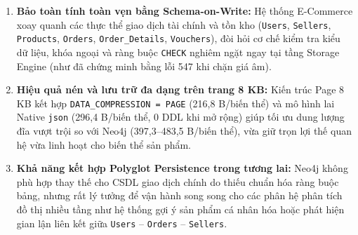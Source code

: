 \begin{enumerate}
  \item \textbf{Bảo toàn tính toàn vẹn bằng Schema-on-Write:} Hệ thống E-Commerce xoay quanh các thực thể giao dịch tài chính và tồn kho (\texttt{Users}, \texttt{Sellers}, \texttt{Products}, \texttt{Orders}, \texttt{Order\_Details}, \texttt{Vouchers}), đòi hỏi cơ chế kiểm tra kiểu dữ liệu, khóa ngoại và ràng buộc \texttt{CHECK} nghiêm ngặt ngay tại tầng Storage Engine (như đã chứng minh bằng lỗi 547 khi chặn giá âm).
  \item \textbf{Hiệu quả nén và lưu trữ đa dạng trên trang 8 KB:} Kiến trúc Page 8 KB kết hợp \texttt{DATA\_COMPRESSION = PAGE} (216,8 B/biến thể) và mô hình lai Native \texttt{json} (296,4 B/biến thể, 0 DDL khi mở rộng) giúp tối ưu dung lượng đĩa vượt trội so với Neo4j (397,3--483,5 B/biến thể), vừa giữ trọn lợi thế quan hệ vừa linh hoạt cho biến thể sản phẩm.
  \item \textbf{Khả năng kết hợp Polyglot Persistence trong tương lai:} Neo4j không phù hợp thay thế cho CSDL giao dịch chính do thiếu chuẩn hóa ràng buộc bảng, nhưng rất lý tưởng để vận hành song song cho các phân hệ phân tích đồ thị nhiều tầng như hệ thống gợi ý sản phẩm cá nhân hóa hoặc phát hiện gian lận liên kết giữa \texttt{Users} -- \texttt{Orders} -- \texttt{Sellers}.
\end{enumerate}


